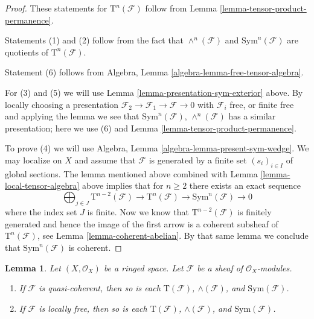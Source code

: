 \documentclass{stacks-project}
\theoremstyle{plain}
\newtheorem{lemma}[subsection]{Lemma}
\theoremstyle{definition}
\theoremstyle{remark}
\numberwithin{equation}{subsection}
\begin{document}
\begin{proof}
These statements for $\text{T}^n(\mathcal{F})$ follow
from Lemma \ref{lemma-tensor-product-permanence}.

\medskip\noindent
Statements (1) and (2) follow from the fact that
$\wedge^n(\mathcal{F})$ and $\text{Sym}^n(\mathcal{F})$
are quotients of $\text{T}^n(\mathcal{F})$.

\medskip\noindent
Statement (6) follows from
Algebra, Lemma \ref{algebra-lemma-free-tensor-algebra}.

\medskip\noindent
For (3) and (5) we will use
Lemma \ref{lemma-presentation-sym-exterior} above.
By locally choosing a presentation
$\mathcal{F}_2 \to \mathcal{F}_1 \to \mathcal{F} \to 0$
with $\mathcal{F}_i$ free, or finite free and applying the
lemma we see that $\text{Sym}^n(\mathcal{F})$, $\wedge^n(\mathcal{F})$
has a similar presentation; here we use (6) and
Lemma \ref{lemma-tensor-product-permanence}.

\medskip\noindent
To prove (4) we will use
Algebra, Lemma \ref{algebra-lemma-present-sym-wedge}.
We may localize on $X$ and assume that
$\mathcal{F}$ is generated by a finite set
$(s_i)_{i \in I}$ of global sections.
The lemma mentioned above
combined with Lemma \ref{lemma-local-tensor-algebra} above
implies that for $n \geq 2$
there exists an exact sequence
$$
\bigoplus\nolimits_{j \in J}
\text{T}^{n - 2}(\mathcal{F})
\to
\text{T}^n(\mathcal{F})
\to
\text{Sym}^n(\mathcal{F})
\to
0
$$
where the index set $J$ is finite. Now we know that
$\text{T}^{n - 2}(\mathcal{F})$ is finitely generated
and hence the image of the first arrow is a coherent
subsheaf of $\text{T}^n(\mathcal{F})$, see Lemma \ref{lemma-coherent-abelian}.
By that same lemma we conclude that $\text{Sym}^n(\mathcal{F})$ is
coherent.
\end{proof}

\begin{lemma}
\label{lemma-whole-tensor-algebra-permanence}
Let $(X, \mathcal{O}_X)$ be a ringed space.
Let $\mathcal{F}$ be a sheaf of $\mathcal{O}_X$-modules.
\begin{enumerate}
\item If $\mathcal{F}$ is quasi-coherent,
then so is each $\text{T}(\mathcal{F})$,
$\wedge(\mathcal{F})$, and $\text{Sym}(\mathcal{F})$.
\item If $\mathcal{F}$ is locally free,
then so is each $\text{T}(\mathcal{F})$,
$\wedge(\mathcal{F})$, and $\text{Sym}(\mathcal{F})$.
\end{enumerate}
\end{lemma}
\end{document}
